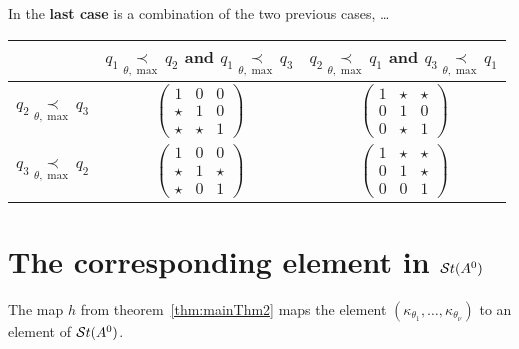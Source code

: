 In the \textbf{last case} is a combination of the two previous cases, \dots
\begin{center}
  \begin{tabular}{c|c|c}
    \multicolumn{1}{c|}{} & 
    $q_1 \underset{\theta,\max}{\prec} q_2$ and
    $q_1 \underset{\theta,\max}{\prec} q_3$
    &
    $q_2 \underset{\theta,\max}{\prec} q_1$ and
    $q_3 \underset{\theta,\max}{\prec} q_1$
    \tabularnewline
    \hline 
    $q_2 \underset{\theta,\max}{\prec} q_3$ & $\begin{pmatrix}1 & 0 & 0\\
    \star & 1 & 0\\
    \star & \star & 1
  \end{pmatrix}$ & $\begin{pmatrix}1 & \star & \star\\
    0 & 1 & 0\\
    0 & \star & 1
  \end{pmatrix}$\tabularnewline
  \hline 
  $q_3 \underset{\theta,\max}{\prec} q_2$ & $\begin{pmatrix}1 & 0 & 0\\
  \star & 1 & \star\\
  \star & 0 & 1
  \end{pmatrix}$ & $\begin{pmatrix}1 & \star & \star\\
  0 & 1 & \star\\
  0 & 0 & 1
  \end{pmatrix}$\tabularnewline
  \end{tabular}
\end{center}

\section{The corresponding element in $\mathcal{S}{}t(A^0)$}
The map $h$ from theorem~\ref{thm:mainThm2} maps the element
$(\kappa_{\theta_1},\dots,\kappa_{\theta_\nu})$ to an element of $\mathcal{S}{}t(A^0)$.
